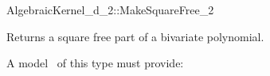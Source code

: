 \begin{ccRefConcept}{AlgebraicKernel_d_2::MakeSquareFree_2}

\ccDefinition
Returns a square free part of a bivariate polynomial.
 
\ccRefines 
{}  

\ccOperations
{}

A model \ccVar\ of this type must provide:

{}

\ccSeeAlso

\end{ccRefConcept}
